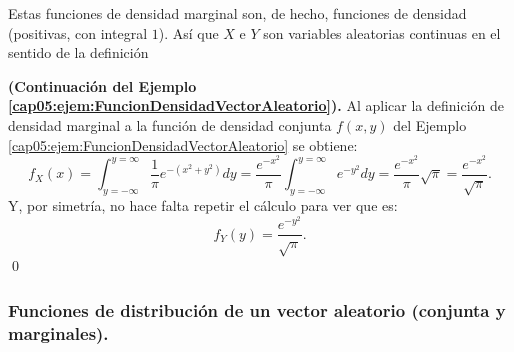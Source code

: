     \begin{center}
    \end{center}

Estas funciones de densidad marginal son, de hecho, funciones de densidad (positivas, con integral $1$). Así que $X$ e $Y$ son variables aleatorias continuas en el sentido de la definición

\begin{ejemplo}
\label{cap05:ejem:DensidadMarginal}
{\bf (Continuación del Ejemplo \ref{cap05:ejem:FuncionDensidadVectorAleatorio}).}
Al aplicar la definición de densidad marginal a la función de densidad conjunta $f(x,y)$ del Ejemplo \ref{cap05:ejem:FuncionDensidadVectorAleatorio} se obtiene:
\[
f_X(x)= \int_{y=-\infty}^{y=\infty} \dfrac{1}{\pi}e^{-(x^2+y^2)}dy = \dfrac{e^{-x^2}}{\pi}\int_{y=-\infty}^{y=\infty}e^{-y^2}dy=
\dfrac{e^{-x^2}}{\pi}\sqrt{\pi}=\dfrac{e^{-x^2}}{\sqrt{\pi}}.
\]
Y, por simetría, no hace falta repetir el cálculo para ver que es:
\[
f_Y(y)= \dfrac{e^{-y^2}}{\sqrt{\pi}}.
\]
\qed
\end{ejemplo}

\subsubsection{Funciones de distribución de un vector aleatorio (conjunta y marginales).}

